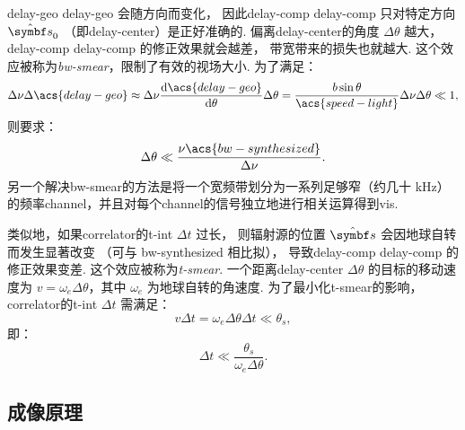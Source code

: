\acl{delay-geo} \acs{delay-geo} 会随方向而变化，
因此\acl{delay-comp} \acs{delay-comp} 只对特定方向 $\hat{\B{s}}_0$
（即\ac{delay-center}）是正好准确的.
偏离\ac{delay-center}的角度 $\Delta\theta$ 越大，
\acl{delay-comp} \acs{delay-comp} 的修正效果就会越差，
带宽带来的损失也就越大.
这个效应被称为\emph{\acf{bw-smear}}，限制了有效的视场大小.
为了满足：
\begin{equation}
  \Delta\nu \Delta\acs{delay-geo}
    \approx \Delta\nu \diff{\acs{delay-geo}}{\theta} \Delta\theta
    = \frac{b \sin\theta}{\acs{speed-light}} \Delta\nu \Delta\theta
    \ll 1,
\end{equation}
则要求：
\begin{equation}
  \Delta\theta \ll \frac{\nu \acs{bw-synthesized}}{\Delta\nu}.
\end{equation}
另一个解决\ac{bw-smear}的方法是将一个宽频带划分为一系列足够窄（约几十 \si{\kHz}）
的频率\ac{channel}，并且对每个\ac{channel}的信号独立地进行相关运算得到\ac{vis}.

类似地，如果\ac{correlator}的\ac{t-int} $\Delta t$ 过长，
则辐射源的位置 $\hat{\B{s}}$ 会因地球自转而发生显著改变
（可与 \acs{bw-synthesized} 相比拟），
导致\acl{delay-comp} \acs{delay-comp} 的修正效果变差.
这个效应被称为\emph{\acf{t-smear}}.
一个距离\ac{delay-center} $\Delta\theta$ 的目标的移动速度为
$v = \omega_e \Delta\theta$，其中 $\omega_e$ 为地球自转的角速度.
为了最小化\ac{t-smear}的影响，\ac{correlator}的\ac{t-int} $\Delta t$ 需满足：
\begin{equation}
  v \Delta t = \omega_e \Delta\theta \Delta t \ll \theta_s,
\end{equation}
即：
\begin{equation}
  \label{eq:correlator-avgtime}
  \Delta t \ll \frac{\theta_s}{\omega_e \Delta\theta}.
\end{equation}

\subsection{成像原理}

